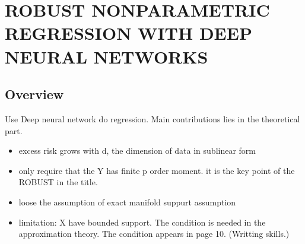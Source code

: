 
\chapter{ROBUST NONPARAMETRIC REGRESSION WITH DEEP NEURAL NETWORKS}
\section*{Overview}

Use Deep neural network do regression.
Main contributions lies in the theoretical part.
\begin{itemize}
  \item excess risk grows with d, the dimension of data in sublinear form
  \item only require that the Y has finite p order moment. it is the key point of the ROBUST in the title.
  \item loose the assumption of exact manifold suppurt assumption
  \item limitation: X have bounded support. The condition is needed in the approximation theory.
  The condition appears in page 10. (Writting skills.)
\end{itemize}





